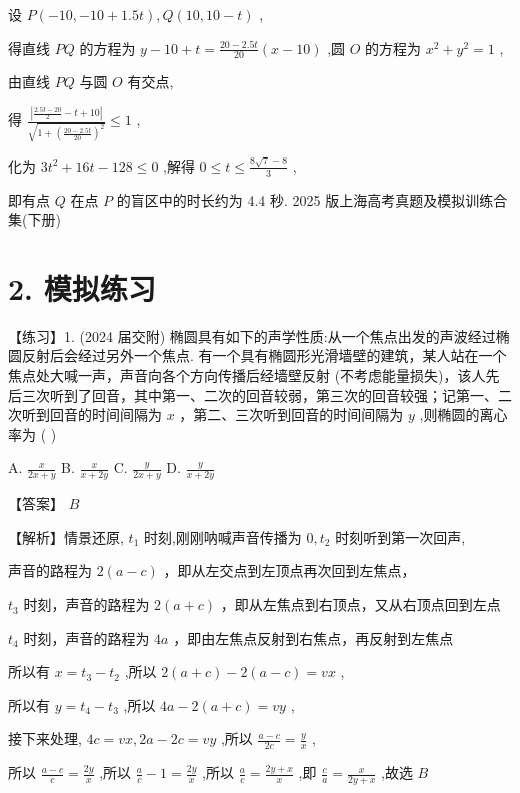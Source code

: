 \documentclass[10pt]{article}
\begin{document}
设 \(P\left( {-{10}, - {10} + {1.5t}}\right) ,Q\left( {{10},{10} - t}\right)\) ,

得直线 \({PQ}\) 的方程为 \(y - {10} + t = \frac{{20} - {2.5t}}{20}\left( {x - {10}}\right)\) ,圆 \(O\) 的方程为 \({x}^{2} + {y}^{2} = 1\) ,

由直线 \({PQ}\) 与圆 \(O\) 有交点,

得 \(\frac{\left| \frac{{2.5t} - {20}}{2} - t + {10}\right| }{\sqrt{1 + {\left( \frac{{20} - {2.5t}}{20}\right) }^{2}}} \leq  1\) ,

化为 \(3{t}^{2} + {16t} - {128} \leq  0\) ,解得 \(0 \leq  t \leq  \frac{8\sqrt{7} - 8}{3}\) ,

即有点 \(Q\) 在点 \(P\) 的盲区中的时长约为 4.4 秒. 2025 版上海高考真题及模拟训练合集(下册)

\section*{2. 模拟练习}

【练习】1. (2024 届交附) 椭圆具有如下的声学性质:从一个焦点出发的声波经过椭圆反射后会经过另外一个焦点. 有一个具有椭圆形光滑墙壁的建筑，某人站在一个焦点处大喊一声，声音向各个方向传播后经墙壁反射 (不考虑能量损失)，该人先后三次听到了回音，其中第一、二次的回音较弱，第三次的回音较强；记第一、二次听到回音的时间间隔为 \(x\) ，第二、三次听到回音的时间间隔为 \(y\) ,则椭圆的离心率为 ( )

A. \(\frac{x}{{2x} + y}\) B. \(\frac{x}{x + {2y}}\) C. \(\frac{y}{{2x} + y}\) D. \(\frac{y}{x + {2y}}\)

【答案】 \(B\)

【解析】情景还原, \({t}_{1}\) 时刻,刚刚呐喊声音传播为 \(0,{t}_{2}\) 时刻听到第一次回声,

声音的路程为 \(2\left( {a - c}\right)\) ，即从左交点到左顶点再次回到左焦点，

\({t}_{3}\) 时刻，声音的路程为 \(2\left( {a + c}\right)\) ，即从左焦点到右顶点，又从右顶点回到左点

\({t}_{4}\) 时刻，声音的路程为 \({4a}\) ，即由左焦点反射到右焦点，再反射到左焦点

所以有 \(x = {t}_{3} - {t}_{2}\) ,所以 \(2\left( {a + c}\right)  - 2\left( {a - c}\right)  = {vx}\) ,

所以有 \(y = {t}_{4} - {t}_{3}\) ,所以 \({4a} - 2\left( {a + c}\right)  = {vy}\) ,

接下来处理, \({4c} = {vx},{2a} - {2c} = {vy}\) ,所以 \(\frac{a - c}{2c} = \frac{y}{x}\) ,

所以 \(\frac{a - c}{c} = \frac{2y}{x}\) ,所以 \(\frac{a}{c} - 1 = \frac{2y}{x}\) ,所以 \(\frac{a}{c} = \frac{{2y} + x}{x}\) ,即 \(\frac{c}{a} = \frac{x}{{2y} + x}\) ,故选 \(B\)
\end{document}
